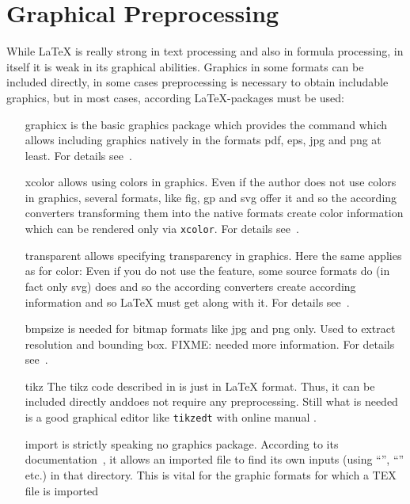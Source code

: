 
\chapter{Graphical Preprocessing}\label{chap:GraphConversions}

While \LaTeX{} is really strong in text processing 
and also in formula processing, 
in itself it is weak in its graphical abilities. 
Graphics in some formats can be included directly, 
in some cases preprocessing is necessary to obtain includable graphics, 
but in most cases, according \LaTeX-packages must be used: 
%
\begin{itemize}
\item[graphicx]
is the basic graphics package which provides the command 
which allows including graphics natively 
in the formats pdf, eps, jpg and png at least. 
For details see~\cite{GraX}. 
\item[xcolor]
allows using colors in graphics. 
Even if the author does not use colors in graphics, 
several formats, like \gls{fig}, \gls{gp} and \gls{svg} 
offer it and so the according converters 
transforming them into the native formats 
create color information which can be rendered only via \texttt{xcolor}. 
For details see~\cite{XColorP}. 
\item[transparent]
allows specifying transparency in graphics. 
Here the same applies as for color: 
Even if you do not use the feature, 
some source formats do (in fact only \gls{svg}) does 
and so the according converters create according information 
and so \LaTeX{} must get along with it. 
For details see~\cite{TransP}. 
\item[bmpsize]
is needed for bitmap formats like \gls{jpg} and \gls{png} only. 
Used to extract resolution and bounding box. 
FIXME\@: needed more information. 
For details see~\cite{BmpP}. 
\item[tikz]
The tikz code described in \cite{TikzPGF} is just in \LaTeX{} format. 
Thus, it can be included directly anddoes not require any preprocessing. 
Still what is needed is a good graphical editor like \texttt{tikzedt} 
with online manual \cite{TikzEdt}. 
\item[import]
is strictly speaking no graphics package. 
According to its documentation~\cite{ImpoP}, 
it allows an imported file to find its own inputs 
(using ``'', ``'' etc.) in that directory. 
This is vital for the graphic formats for which a TEX file is imported 

\end{itemize}
